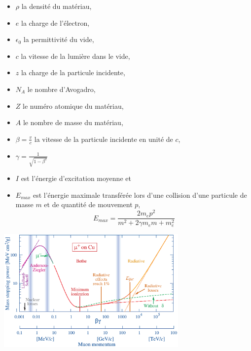\begin{itemize}[label=$\bullet$]
	\item $\rho$ la densité du matériau,
	\item $e$ la charge de l'électron,
	\item $\epsilon_{0}$ la permittivité du vide,
	\item $c$ la vitesse de la lumière dans le vide,
	\item $z$ la charge de la particule incidente,
	\item $N_{A}$ le nombre d'Avogadro,
	\item $Z$ le numéro atomique du matériau,
	\item $A$ le nombre de masse du matériau,
	\item $\beta=\frac{v}{c}$ la vitesse de la particule incidente en unité de $c$,
	\item $\gamma=\frac{1}{\sqrt{1-\beta^{2}}}$
	\item $I$ est l'énergie d'excitation moyenne et
	\item $E_{max}$ est l'énergie maximale transférée lors d'une collision d'une particule de masse $m$ et de quantité de mouvement $p$,
	\begin{equation}
	E_{max}=\frac{2m_{e}p^{2}}{m^2+2\gamma m_{e}m+m_{e}^2}
	\end{equation}
\end{itemize}

\begin{minipagewithmarginpars}[h]{0.95\textwidth}
	\centering
	\includegraphics[width=0.70\textwidth]{RPC/Bethe-Bloch.eps}
	\label{Bethe-Block}
\end{minipagewithmarginpars}

